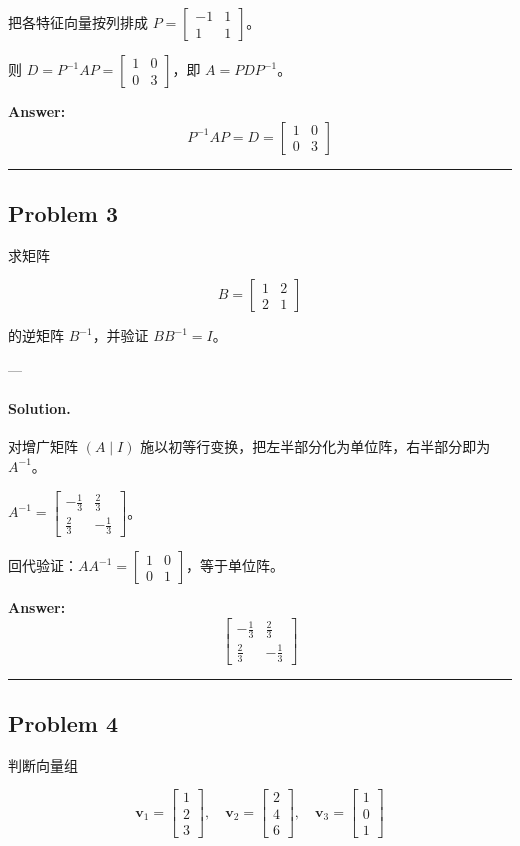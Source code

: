 \documentclass[12pt, a4paper]{article}
\newcommand{\problem}[1]{\subsection*{Problem #1}}
\newcommand{\solution}{\paragraph{Solution.}}
\begin{document}
把各特征向量按列排成 $P = \left[\begin{matrix}-1 & 1\\1 & 1\end{matrix}\right]$。

则 $D = P^{-1}AP = \left[\begin{matrix}1 & 0\\0 & 3\end{matrix}\right]$，即 $A = PDP^{-1}$。

\textbf{Answer:}
\[\boxed{P^{-1}AP = D = \left[\begin{matrix}1 & 0\\0 & 3\end{matrix}\right]}\]

\vspace{1em}
\hrule
\vspace{1em}

\problem{3}

求矩阵

$$B = \begin{bmatrix} 1 & 2 \\ 2 & 1 \end{bmatrix}$$

的逆矩阵 $B^{-1}$，并验证 $BB^{-1} = I$。

---

\solution

对增广矩阵 $(A\mid I)$ 施以初等行变换，把左半部分化为单位阵，右半部分即为 $A^{-1}$。

$A^{-1} = \left[\begin{matrix}- \frac{1}{3} & \frac{2}{3}\\\frac{2}{3} & - \frac{1}{3}\end{matrix}\right]$。

回代验证：$AA^{-1} = \left[\begin{matrix}1 & 0\\0 & 1\end{matrix}\right]$，等于单位阵。

\textbf{Answer:}
\[\boxed{\left[\begin{matrix}- \frac{1}{3} & \frac{2}{3}\\\frac{2}{3} & - \frac{1}{3}\end{matrix}\right]}\]

\vspace{1em}
\hrule
\vspace{1em}

\problem{4}

判断向量组

$$\mathbf{v}_1 = \begin{bmatrix} 1 \\ 2 \\ 3 \end{bmatrix}, \quad
  \mathbf{v}_2 = \begin{bmatrix} 2 \\ 4 \\ 6 \end{bmatrix}, \quad
  \mathbf{v}_3 = \begin{bmatrix} 1 \\ 0 \\ 1 \end{bmatrix}$$
\end{document}
